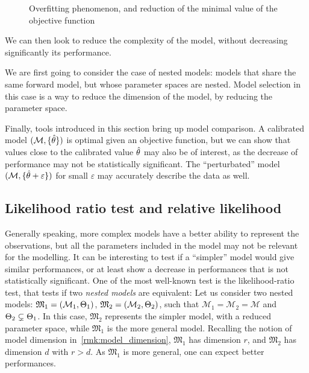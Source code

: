 \documentclass[../../Main_ManuscritThese.tex]{subfiles}
\newcommand\imgpath{/home/victor/acadwriting/Manuscrit/Text/Chapter2/img/}
\begin{document}
\begin{figure}[ht]
  \centering
  
  \caption[Example of overfitting phenomenon]{\label{fig:overfitting} Overfitting phenomenon, and reduction of the minimal value of the objective function}
\end{figure}


We can then look to reduce the complexity of the model, without
decreasing significantly its performance.

We are first going to consider the case of nested models: models that
share the same forward model, but whose parameter spaces are
nested. Model selection in this case is a way to reduce the dimension
of the model, by reducing the parameter space.

Finally, tools introduced in this section bring up model comparison. A
calibrated model $(\mathcal{M},\{\hat{\theta}\})$ is optimal given an
objective function, but we can show that values close to the
calibrated value $\hat{\theta}$ may also be of interest, as the decrease
of performance may not be statistically significant. The
``perturbated'' model $(\mathcal{M}, \{\hat{\theta} + \varepsilon\})$ for
small $\varepsilon$ may accurately describe the data as well.

\subsection{Likelihood ratio test and relative likelihood}
\label{sec:likelihood_ratio_test}
Generally speaking, more complex models have a better ability to
represent the observations, but all the parameters included in the model may
not be relevant for the modelling. It can be interesting to test if a
``simpler'' model would give similar performances, or at least show a
decrease in performances that is not statistically significant.  One
of the most well-known test is the likelihood-ratio test, that tests
if two \emph{nested models} are equivalent: Let us consider two nested
models: $\mathfrak{M}_1 = (\mathcal{M}_1, \Theta_1)$,
$\mathfrak{M}_2= (\mathcal{M}_2,\Theta_2)$, such that
$\mathcal{M}_1=\mathcal{M}_2=\mathcal{M}$ and
$\Theta_2 \subsetneq \Theta_1$. In this case, $\mathfrak{M}_2$
represents the simpler model, with a reduced parameter space, while
$\mathfrak{M}_1$ is the more general model. Recalling the notion of
model dimension in~\cref{rmk:model_dimension}, $\mathfrak{M}_1$ has
dimension $r$, and $\mathfrak{M}_2$ has dimension $d$ with $r>d$.  As
$\mathfrak{M}_1$ is more general, one can expect better performances.
\end{document}
